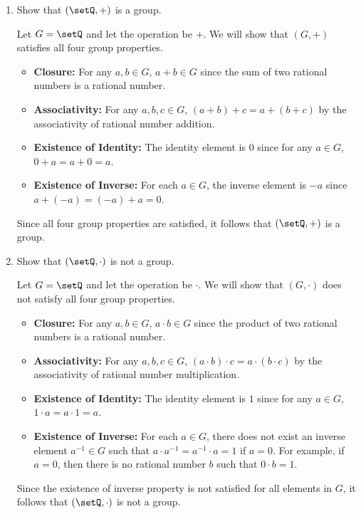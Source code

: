\begin{enumerate}
\begin{subprove}
  \end{subprove}
  \item Show that \((\setQ, +)\) is a group.
  \begin{subprove}
    Let \(G = \setQ\) and let the operation be \(+\).
    We will show that \((G, +)\) satisfies all four group properties.
    \begin{itemize}
      \item \textbf{Closure:} For any \(a, b \in G\), \(a + b \in G\) since the sum of two rational numbers is a rational number.
      \item \textbf{Associativity:} For any \(a, b, c \in G\), \((a + b) + c = a + (b + c)\) by the associativity of rational number addition.
      \item \textbf{Existence of Identity:} The identity element is \(0\) since for any \(a \in G\), \(0 + a = a + 0 = a\).
      \item \textbf{Existence of Inverse:} For each \(a \in G\), the inverse element is \(-a\) since \(a + (-a) = (-a) + a = 0\).
    \end{itemize}
    Since all four group properties are satisfied, it follows that \((\setQ, +)\) is a group.
  \end{subprove}
  \item Show that \((\setQ, \cdot)\) is not a group.
  \begin{subprove}
    Let \(G = \setQ\) and let the operation be \(\cdot\).
    We will show that \((G, \cdot)\) does not satisfy all four group properties.
    \begin{itemize}
      \item \textbf{Closure:} For any \(a, b \in G\), \(a \cdot b \in G\) since the product of two rational numbers is a rational number.
      \item \textbf{Associativity:} For any \(a, b, c \in G\), \((a \cdot b) \cdot c = a \cdot (b \cdot c)\) by the associativity of rational number multiplication.
      \item \textbf{Existence of Identity:} The identity element is \(1\) since for any \(a \in G\), \(1 \cdot a = a \cdot 1 = a\).
      \item \textbf{Existence of Inverse:} For each \(a \in G\), there does not exist an inverse element \(a^{-1} \in G\) such that \(a \cdot a^{-1} = a^{-1} \cdot a = 1\) if \(a = 0\). For example, if \(a = 0\), then there is no rational number \(b\) such that \(0 \cdot b = 1\).
    \end{itemize}
    Since the existence of inverse property is not satisfied for all elements in \(G\), it follows that \((\setQ, \cdot)\) is not a group.

\end{subprove}
\end{enumerate}
